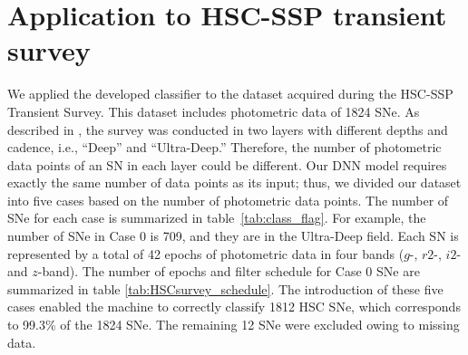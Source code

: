 \documentclass[useamsfonts]{pasj01}
\begin{document}
\section{Application to HSC-SSP transient survey}
\label{sec:h}
%
We applied the developed classifier to the dataset acquired during the HSC-SSP Transient Survey. This dataset includes photometric data of 1824 SNe.
As described in \citet{yasuda19a}, the survey %
was conducted in two layers with different depths and cadence, i.e., ``Deep'' and ``Ultra-Deep.''
Therefore, the number of photometric data points of an SN in each layer could be different.
Our DNN model requires exactly the same number of data points as its input; thus, we divided our dataset into five cases based on the number of photometric data points.
%
The number of SNe for each case is summarized in table\ \ref{tab:class_flag}.
For example, the number of SNe in Case 0 is 709, and they are in the Ultra-Deep field. Each SN is represented by a total of 
42 epochs of photometric data in four bands ($g$-, $r2$-, $i2$- and $z$-band).
The number of epochs and filter schedule for Case 0 SNe are summarized in table \ref{tab:HSCsurvey_schedule}.
The introduction of these five cases enabled the machine to correctly classify 1812 HSC SNe, which corresponds to 99.3\% of the 1824 SNe.
The remaining 12 SNe were excluded owing to missing data.
%
\begin{table}[htbp]
\label{tab:class_flag}
\end{table}
\end{document}
